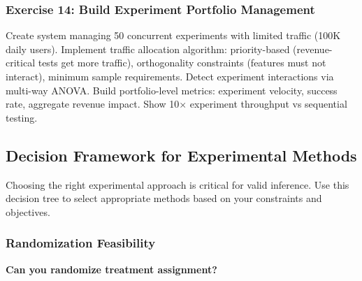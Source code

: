 \subsubsection{Exercise 14: Build Experiment Portfolio Management}

Create system managing 50 concurrent experiments with limited traffic (100K daily users). Implement traffic allocation algorithm: priority-based (revenue-critical tests get more traffic), orthogonality constraints (features must not interact), minimum sample requirements. Detect experiment interactions via multi-way ANOVA. Build portfolio-level metrics: experiment velocity, success rate, aggregate revenue impact. Show 10$\times$ experiment throughput vs sequential testing.

\subsection{Decision Framework for Experimental Methods}

Choosing the right experimental approach is critical for valid inference. Use this decision tree to select appropriate methods based on your constraints and objectives.

\subsubsection{Randomization Feasibility}

\textbf{Can you randomize treatment assignment?}

